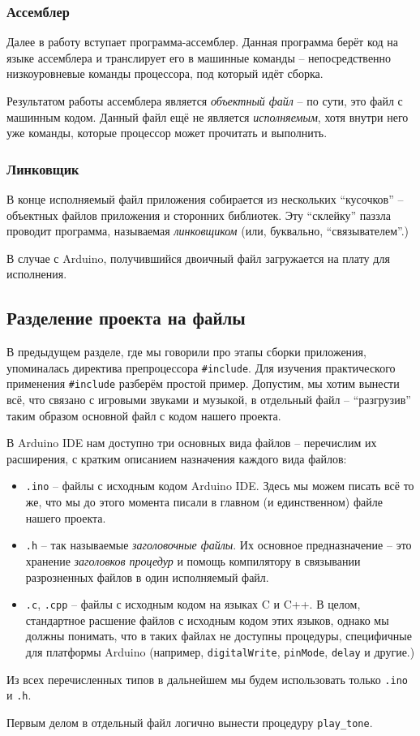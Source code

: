 \documentclass[../sparc.tex]{subfiles}
\begin{document}
\subsubsection{Ассемблер}

Далее в работу вступает программа-ассемблер.  Данная программа берёт код на
языке ассемблера и транслирует его в машинные команды -- непосредственно
низкоуровневые команды процессора, под который идёт сборка.

Результатом работы ассемблера является \emph{объектный файл} -- по сути, это файл
с машинным кодом.  Данный файл ещё не является \emph{исполняемым}, хотя внутри
него уже команды, которые процессор может прочитать и выполнить.

\subsubsection{Линковщик}

В конце исполняемый файл приложения собирается из нескольких ``кусочков'' --
объектных файлов приложения и сторонних библиотек.  Эту ``склейку'' паззла
проводит программа, называемая \emph{линковщиком} (или, буквально,
``связывателем''.)

В случае с Arduino, получившийся двоичный файл загружается на плату для
исполнения.

\subsection{Разделение проекта на файлы}
\label{subsection:multi-file-applications}

В предыдущем разделе, где мы говорили про этапы сборки приложения, упоминалась
директива препроцессора \texttt{#include}.  Для изучения практического
применения \texttt{#include} разберём простой пример.  Допустим, мы
хотим вынести всё, что связано с игровыми звуками и музыкой, в отдельный файл --
``разгрузив'' таким образом основной файл с кодом нашего проекта.

В Arduino IDE нам доступно три основных вида файлов -- перечислим их расширения,
с кратким описанием назначения каждого вида файлов:
\begin{itemize}
\item \texttt{.ino} -- файлы с исходным кодом Arduino IDE.  Здесь мы можем писать
  всё то же, что мы до этого момента писали в главном (и единственном) файле
  нашего проекта.
\item \texttt{.h} -- так называемые \emph{заголовочные файлы}.  Их основное
  предназначение -- это хранение \emph{заголовков процедур} и помощь компилятору
  в связывании разрозненных файлов в один исполняемый файл.
\item \texttt{.с}, \texttt{.cpp} -- файлы с исходным кодом на языках C и C++.  В
  целом, стандартное расшение файлов с исходным кодом этих языков, однако мы
  должны понимать, что в таких файлах не доступны процедуры, специфичные для
  платформы Arduino (например, \texttt{digitalWrite},
  \texttt{pinMode}, \texttt{delay} и другие.)
\end{itemize}

Из всех перечисленных типов в дальнейшем мы будем использовать только
\texttt{.ino} и \texttt{.h}.

Первым делом в отдельный файл логично вынести процедуру
\texttt{play_tone}.
\end{document}
